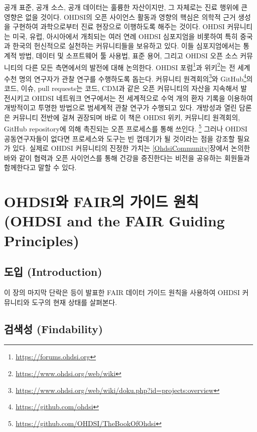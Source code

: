 \documentclass[11pt]{book}
\let\rmarkdownfootnote\footnote%
\def\footnote{\protect\rmarkdownfootnote}
\theoremstyle{definition}
\theoremstyle{definition}
\theoremstyle{definition}
\theoremstyle{remark}
\begin{document}
공개 표준, 공개 소스, 공개 데이터는 훌륭한 자산이지만, 그 자체로는 진료
행위에 큰 영향은 없을 것이다. OHDSI의 오픈 사이언스 활동과 영향의 핵심은
의학적 근거 생성을 구현하여 과학으로부터 진료 현장으로 이행하도록 해주는
것이다. OHDSI 커뮤니티는 미국, 유럽, 아시아에서 개최되는 여러 연례 OHDSI
심포지엄을 비롯하여 특히 중국과 한국의 헌신적으로 실천하는 커뮤니티들을
보유하고 있다. 이들 심포지엄에서는 통계적 방법, 데이터 및 소프트웨어 툴
사용법, 표준 용어, 그리고 OHDSI 오픈 소스 커뮤니티의 다른 모든
측면에서의 발전에 대해 논의한다. OHDSI 포럼\footnote{\url{https://forums.ohdsi.org}}과
위키\footnote{\url{https://www.ohdsi.org/web/wiki}}는 전 세계 수천 명의
연구자가 관찰 연구를 수행하도록 돕는다. 커뮤니티 원격회의\footnote{\url{https://www.ohdsi.org/web/wiki/doku.php?id=projects:overview}}와
GitHub\footnote{\url{https://github.com/ohdsi}}의 코드, 이슈, pull
requests는 코드, CDM과 같은 오픈 커뮤니티의 자산을 지속해서 발전시키고
OHDSI 네트워크 연구에서는 전 세계적으로 수억 개의 환자 기록을 이용하여
개방적이고 투명한 방법으로 범세계적 관찰 연구가 수행되고 있다. 개방성과
열린 담론은 커뮤니티 전반에 걸쳐 권장되며 바로 이 책은 OHDSI 위키,
커뮤니티 원격회의, GitHub repository에 의해 촉진되는 오픈 프로세스를
통해 쓰인다. \footnote{\url{https://github.com/OHDSI/TheBookOfOhdsi}}
그러나 OHDSI 공동연구자들이 없다면 프로세스와 도구는 빈 껍데기가 될
것이라는 점을 강조할 필요가 있다. 실제로 OHDSI 커뮤니티의 진정한 가치는
\ref{OhdsiCommunity}장에서 논의한 바와 같이 협력과 오픈 사이언스를 통해
건강을 증진한다는 비전을 공유하는 회원들과 함께한다고 말할 수 있다.

\section{OHDSI와 FAIR의 가이드 원칙 (OHDSI and the FAIR Guiding
Principles)}\label{ohdsi-fair---ohdsi-and-the-fair-guiding-principles}


\subsection{도입 (Introduction)}\label{-introduction}

이 장의 마지막 단락은 \citet{wilkinson2016} 등이 발표한 FAIR 데이터
가이드 원칙을 사용하여 OHDSI 커뮤니티와 도구의 현재 상태를 살펴본다.

\subsection{검색성 (Findability)}\label{-findability}
\end{document}

